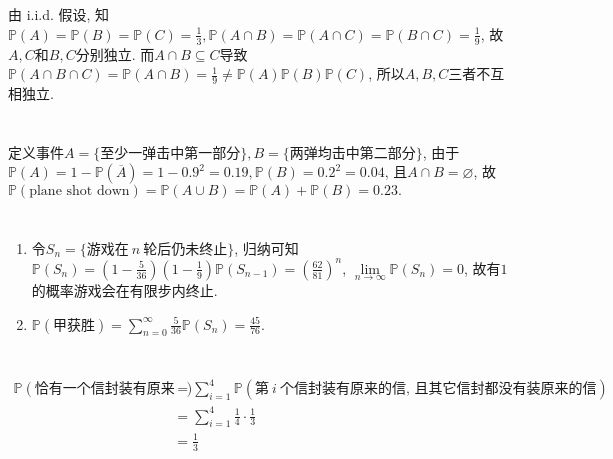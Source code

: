 \documentclass[8pt]{article}
\theoremstyle{compact}
\def\P#1{\mathbb{P}\left({#1}\right)}
\begin{document}
\section{}

	由 i.i.d. 假设, 知$\P{A} = \P{B} = \P{C} = \frac13, \P{A \cap B} = \P{A \cap C} = \P{B \cap C} = \frac19$, 故$A, C$和$B, C$分别独立. 而$A \cap B \subseteq C$导致$\P{A \cap B \cap C} = \P{A \cap B} = \frac19 \neq \P{A}\P{B}\P{C}$, 所以$A, B, C$三者不互相独立.

\section{}

	定义事件$A = \{\mbox{至少一弹击中第一部分}\}, B = \{\mbox{两弹均击中第二部分}\}$, 由于$\P{A} = 1 - \P{\overline{A}} = 1 - 0.9^2 = 0.19, \P{B} = 0.2^2 = 0.04$, 且$A \cap B = \varnothing$, 故$\P{\textrm{plane shot down}} = \P{A \cup B} = \P{A} + \P{B} = 0.23.	$

\section{}

	\begin{enumerate}
		\item 令$S_n = \{\mbox{游戏在}\ n\ \mbox{轮后仍未终止}\}$, 归纳可知$\P{S_n} = \left( 1 - \frac{5}{36}\right)\left(1 - \frac 19\right)\P{S_{n-1}} = \left(\frac{62}{81}\right)^n$, $\lim\limits_{n \to \infty}\P{S_n} = 0$, 故有$1$的概率游戏会在有限步内终止.
		\item $\P{\mbox{甲获胜}} = \sum\limits_{n=0}^{\infty}\frac{5}{36}\P{S_n} = \frac{45}{76}.$
	\end{enumerate}

\section{}
	\begin{align*}
		\P{\mbox{恰有一个信封装有原来的信}} &= \sum_{i=1}^{4} \P{\mbox{第}\ i\ \mbox{个信封装有原来的信, 且其它信封都没有装原来的信}} \\
		&= \sum_{i=1}^{4} \frac14 \cdot \frac13\\
		&= \frac13
	\end{align*}

\section{}
	
\end{document}
